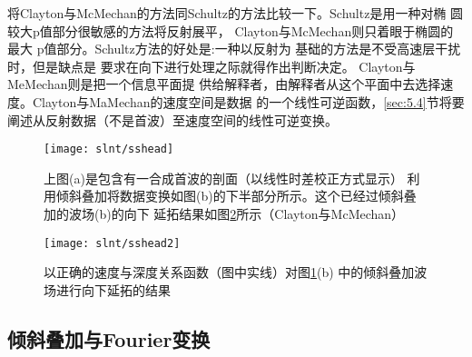 将Clayton与McMechan的方法同Schultz的方法比较一下。Schultz是用一种对椭
圆较大p值部分很敏感的方法将反射展平，
Clayton与McMechan则只着眼于椭圆的最大
p值部分。Schultz方法的好处是:一种以反射为
基础的方法是不受高速层干扰时，但是缺点是
要求在向下进行处理之际就得作出判断决定。
Clayton与MeMechan则是把一个信息平面提
供给解释者，由解释者从这个平面中去选择速度。Clayton与MaMechan的速度空间是数据
的一个线性可逆函数，\ref{sec:5.4}节将要阐述从反射数据（不是首波）至速度空间的线性可逆变换。

\begin{figure}[H]
\centering
\texttt{[image: slnt/sshead]}
\caption[sshead]{上图(a)是包含有一合成首波的剖面（以线性时差校正方式显示）
利用倾斜叠加将数据变换如图(b)的下半部分所示。这个已经过倾斜叠加的波场(b)的向下
延拓结果如图\ref{fig:slnt/sshead2}所示（Clayton与McMechan）}
\label{fig:slnt/sshead}
\end{figure}

\begin{figure}[H]
\centering
\texttt{[image: slnt/sshead2]}
\caption[sshead2]{以正确的速度与深度关系函数（图中实线）对图\ref{fig:slnt/sshead}(b)
中的倾斜叠加波场进行向下延拓的结果}
\label{fig:slnt/sshead2}
\end{figure}

\subsection{倾斜叠加与Fourier变换}
\label{sec:5.2.6}

